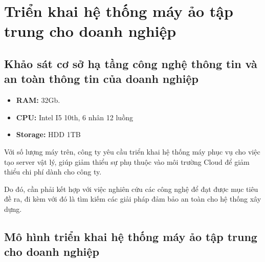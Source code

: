 \documentclass[12pt,a4paper]{report}
\begin{document}
	\chapter{Triển khai hệ thống máy ảo tập trung cho doanh nghiệp}
	\section{Khảo sát cơ sở hạ tầng công nghệ thông tin và an toàn thông tin của doanh nghiệp}
		\hspace{1.0cm}{Cơ sở hạ tầng công nghệ trong công ty hiện tại gần như không có. Do có gói doanh nghiệp mới của AWS Cloud, cho nên môi trường làm việc sẽ hầu hết được triển khai trên hệ thống Cloud. Tuy nhiên, vốn của gói này không phải là vô tận, cho nên công ty đã triển khai xây dựng hệ thóng máy chủ trên công ty.}
		
		\hspace{0.3cm}{Công ty đã cung cấp cho bên DevOps một số lượng máy tính cụ thể, bao gồm 9 máy vật lý với các cấu hình như sau:}
			\begin{itemize}
				\item {\textbf{RAM: } 32Gb.}
				\item {\textbf{CPU: } Intel I5 10th, 6 nhân 12 luồng }
				\item {\textbf{Storage: } HDD 1TB}
			\end{itemize}
		\hspace{0.3cm} {Với số lượng máy trên, công ty yêu cầu triển khai hệ thống máy phục vụ cho việc tạo server vật lý, giúp giảm thiểu sự phụ thuộc vào môi trường Cloud để giảm thiểu chi phí dành cho công ty.}
		
		\hspace{0.3cm} {Do đó, cần phải kết hợp với việc nghiên cứu các công nghệ để đạt được mục tiêu đề ra, đi kèm với đó là tìm kiếm các giải pháp đảm bảo an toàn cho hệ thống xây dựng.}
	
	\section{Mô hình triển khai hệ thống máy ảo tập trung cho doanh nghiệp}	
	
\end{document}
